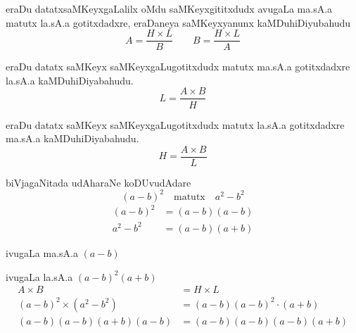 eraDu datatxsaMKeyxgaLalilx oMdu saMKeyxgititxdudx avugaLa ma.sA.a matutx la.sA.a gotitxdadxre, eraDaneya saMKeyxyanunx kaMDuhiDiyubahudu
$$
A= \frac{H \times L}{B} \qquad  B= \frac{H \times L}{A}
$$

eraDu datatx saMKeyx saMKeyxgaLugotitxdudx matutx ma.sA.a gotitxdadxre la.sA.a kaMDuhiDiyabahudu.
$$
L=\frac{A\times B}{H}
$$

eraDu datatx saMKeyx saMKeyxgaLugotitxdudx matutx la.sA.a gotitxdadxre ma.sA.a kaMDuhiDiyabahudu.
$$
H=\frac{A\times B}{L}
$$

biVjagaNitada udAharaNe koDUvudAdare
$$
(a-b)^2 \quad\text{matutx}\quad a^{2}-b^{2}
$$
\begin{align*}
(a-b)^2 &= (a-b)(a-b)\\
a^2-b^2 &= (a-b)(a+b)
\end{align*}

ivugaLa ma.sA.a $(a-b)$

ivugaLa la.sA.a $(a-b)^2(a+b)$
\begin{align*}
A\times B &= H\times L\\
(a-b)^2 \times (a^2-b^2) &= (a-b)(a-b)^2\cdot(a+b)\\
(a-b)(a-b)(a+b)(a-b) &= (a-b)(a-b)(a-b)(a+b)
\end{align*}
